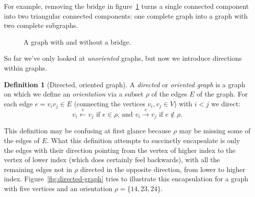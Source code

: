 \documentclass{amsart}
\theoremstyle{plain}
\theoremstyle{remark}
\theoremstyle{definition}
\newtheorem*{definition}{Definition}
\begin{document}
For example, removing the bridge in figure~\ref{fig:bridge} turns a single
connected component into two triangular connected components:
one complete graph into a graph with two complete subgraphs.
\begin{figure}[h]
  \hspace{1cm}
  \caption[Bridges]{A graph with and without a bridge.}
  \label{fig:bridge}
\end{figure}
So far we've only looked at \emph{unoriented} graphs, but
now we introduce directions within graphs.
\begin{definition}[Directed, oriented graph]
  A \emph{directed} or \emph{oriented graph} is a graph on which we
  define an \emph{orientation} via a subset $\rho$ of the edges $E$ of the
  graph. For each edge $e=v_i v_j\in E$ (connecting the vertices $v_i,v_j\in
  V$) with $i<j$ we direct:
  \[
    v_i\stackrel{e}{\leftarrow}v_j\text{ if }e\in\rho\text{, and }
    v_i\stackrel{e}{\rightarrow}v_j\text{ if }e\notin\rho.
  \]
\end{definition}
This definition may be confusing at first glance because $\rho$
may be missing some of the edges of $E$. What this definition attempts to succinctly
encapsulate is only the edges with their direction pointing from the vertex of higher
index to the vertex of lower index (which does certainly feel backwards),
with all the remaining edges not in $\rho$ directed in the opposite direction,
from lower to higher index.
Figure~\ref{fig:directed-graph} tries to illustrate this encapsulation for a graph
with five vertices and an orientation $\rho=\{14,23,24\}$.
\end{document}
